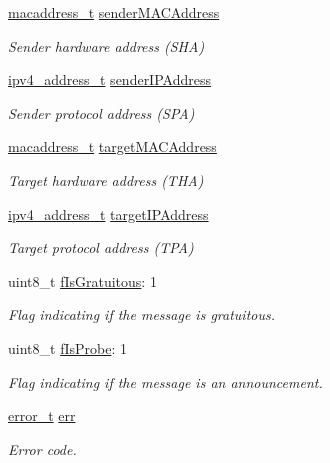 \begin{DoxyCompactItemize}
\mbox{\hyperlink{group__ethernet_gacb865bcbf50a6c8cef05581bfabff373}{macaddress\+\_\+t}} \mbox{\hyperlink{struct_a_r_p__message_a493c6c0fac00d24d97c5dd27e448d192}{sender\+M\+A\+C\+Address}}
\begin{DoxyCompactList}\small\item\em Sender hardware address (S\+HA) \end{DoxyCompactList}\item 
\mbox{\hyperlink{group__ipv4_gad9df0882950e70d0587a4b423beb261a}{ipv4\+\_\+address\+\_\+t}} \mbox{\hyperlink{struct_a_r_p__message_a9532eb4e3dafc35df5f0cbd0598e6064}{sender\+I\+P\+Address}}
\begin{DoxyCompactList}\small\item\em Sender protocol address (S\+PA) \end{DoxyCompactList}\item 
\mbox{\hyperlink{group__ethernet_gacb865bcbf50a6c8cef05581bfabff373}{macaddress\+\_\+t}} \mbox{\hyperlink{struct_a_r_p__message_a07b2e71c5ec73e1d4828fd350bd4f041}{target\+M\+A\+C\+Address}}
\begin{DoxyCompactList}\small\item\em Target hardware address (T\+HA) \end{DoxyCompactList}\item 
\mbox{\hyperlink{group__ipv4_gad9df0882950e70d0587a4b423beb261a}{ipv4\+\_\+address\+\_\+t}} \mbox{\hyperlink{struct_a_r_p__message_a311d8e70c5a5a8b8b1e613e44ba25639}{target\+I\+P\+Address}}
\begin{DoxyCompactList}\small\item\em Target protocol address (T\+PA) \end{DoxyCompactList}\item 
uint8\+\_\+t \mbox{\hyperlink{struct_a_r_p__message_a10f6f518105e71039413d95c27db5a5d}{f\+Is\+Gratuitous}}\+: 1
\begin{DoxyCompactList}\small\item\em Flag indicating if the message is gratuitous. \end{DoxyCompactList}\item 
uint8\+\_\+t \mbox{\hyperlink{struct_a_r_p__message_ad84934498bc8cb014f7ccfd3df0eaaab}{f\+Is\+Probe}}\+: 1
\begin{DoxyCompactList}\small\item\em Flag indicating if the message is an announcement. \end{DoxyCompactList}\item 
\mbox{\hyperlink{group__error_gad3ae44be85fe6952dcaed425499e8f6b}{error\+\_\+t}} \mbox{\hyperlink{struct_a_r_p__message_a79e8f977787d9fccf257bbbccaaf3522}{err}}
\begin{DoxyCompactList}\small\item\em Error code. \end{DoxyCompactList}\end{DoxyCompactItemize}


